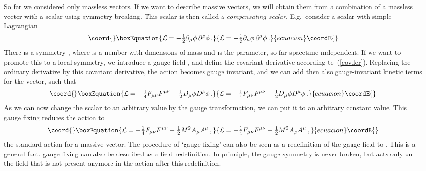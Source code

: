 \documentclass[a4paper,11pt,twoside]{article}
\providecommand{\Red}[1]{#1}
\providecommand{\OliveGreen}[1]{#1}
\providecommand{\RawSienna}[1]{#1}
\providecommand{\Blue}[1]{#1}
\providecommand{\ft}[2]{{\textstyle\frac{#1}{#2}}}
\begin{document}
So far we considered only massless vectors. If we want to describe
massive vectors, we will obtain them from a combination of a massless
vector with a scalar using symmetry breaking. This scalar is then called
a \emph{compensating scalar}. E.g.\ consider a scalar with simple
Lagrangian
\begin{equation}\coord{}\boxEquation{
  {\cal L}=-\ft12 \partial _\mu \Red{\phi}\,\partial ^ \mu\Red{\phi}\,.
 \label{Lscalar}
}{
  {\cal L}=-\ft12 \partial _\mu \Red{\phi}\,\partial ^ \mu\Red{\phi}\,.
 }{ecuacion}\coordE{}\end{equation}
There is a symmetry \myHighlight{$\delta(\Lambda) \Red{\phi} =M\OliveGreen{\Lambda}$}\coordHE{},
where \coordHE{} is a number with dimensions of mass and \myHighlight{$\Lambda $}\coordHE{} is the
parameter, so far spacetime-independent. If we want to promote this to a
local symmetry, we introduce a gauge field \myHighlight{$\Blue{A_\mu}$}\coordHE{}, and define the
covariant derivative \myHighlight{$\RawSienna{D_\mu \phi} =\partial _\mu \Red{\phi}
-M\Blue{A_\mu}$}\coordHE{} according to~(\ref{covder}). Replacing the ordinary
derivative by this covariant derivative, the action becomes gauge
invariant, and we can add then also gauge-invariant kinetic terms for the
vector, such that
\begin{equation}\coord{}\boxEquation{
  {\cal L}=-\ft14 \RawSienna{F_{\mu \nu }F^{\mu \nu }}-\ft12\RawSienna{D_\mu \phi D^\mu \phi}
  \,.
 \label{L10}
}{
  {\cal L}=-\ft14 \RawSienna{F_{\mu \nu }F^{\mu \nu }}-\ft12\RawSienna{D_\mu \phi D^\mu \phi}
  \,.
 }{ecuacion}\coordE{}\end{equation}
As we can now change the scalar to an arbitrary value by the gauge
transformation, we can put it to an arbitrary constant value. This gauge
fixing reduces the action to
\begin{equation}\coord{}\boxEquation{
  {\cal L}=-\ft14 \RawSienna{F_{\mu \nu }F^{\mu \nu }}-\ft12M^2\Blue{A_\mu
  A^\mu}\,,
 \label{Lmassive1}
}{
  {\cal L}=-\ft14 \RawSienna{F_{\mu \nu }F^{\mu \nu }}-\ft12M^2\Blue{A_\mu
  A^\mu}\,,
 }{ecuacion}\coordE{}\end{equation}
the standard action for a massive vector. The procedure of `gauge-fixing'
can also be seen as a redefinition of the gauge field \myHighlight{$\Blue{A_\mu }$}\coordHE{} to
\myHighlight{$\Blue{A_\mu }-\frac{1}{M}\partial _\mu \Red{\phi}$}\coordHE{}. This is a general
fact: gauge fixing can also be described as a field redefinition. In
principle, the gauge symmetry is never broken, but acts only on the field
that is not present anymore in the action after this redefinition.
\end{document}
